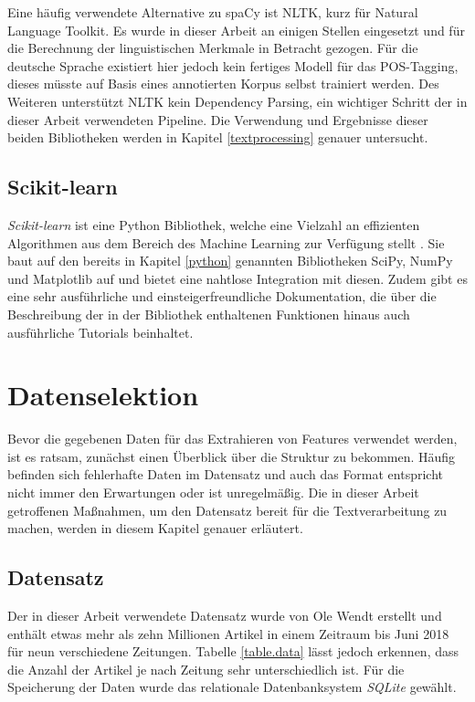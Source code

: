 Eine häufig verwendete Alternative zu spaCy ist NLTK, kurz für Natural Language Toolkit. Es wurde in dieser Arbeit an einigen Stellen eingesetzt und für die Berechnung der linguistischen Merkmale in Betracht gezogen. Für die deutsche Sprache existiert hier jedoch kein fertiges Modell für das POS-Tagging, dieses müsste auf Basis eines annotierten Korpus selbst trainiert werden. Des Weiteren unterstützt NLTK kein Dependency Parsing, ein wichtiger Schritt der in dieser Arbeit verwendeten Pipeline. Die Verwendung und Ergebnisse dieser beiden Bibliotheken werden in Kapitel \ref{textprocessing} genauer untersucht.

\subsection{Scikit-learn}
\emph{Scikit-learn} ist eine Python Bibliothek, welche eine Vielzahl an effizienten Algorithmen aus dem Bereich des Machine Learning zur Verfügung stellt \cite{scikit-learn}. Sie baut auf den bereits in Kapitel \ref{python} genannten Bibliotheken SciPy, NumPy und Matplotlib auf und bietet eine nahtlose Integration mit diesen. Zudem gibt es eine sehr ausführliche und einsteigerfreundliche Dokumentation, die über die Beschreibung der in der Bibliothek enthaltenen Funktionen hinaus auch ausführliche Tutorials beinhaltet.

\section{Datenselektion}
Bevor die gegebenen Daten für das Extrahieren von Features verwendet werden, ist es ratsam, zunächst einen Überblick über die Struktur zu bekommen. Häufig befinden sich fehlerhafte Daten im Datensatz und auch das Format entspricht nicht immer den Erwartungen oder ist unregelmäßig. Die in dieser Arbeit getroffenen Maßnahmen, um den Datensatz bereit für die Textverarbeitung zu machen, werden in diesem Kapitel genauer erläutert.

\subsection{Datensatz}
Der in dieser Arbeit verwendete Datensatz wurde von Ole Wendt erstellt und enthält etwas mehr als zehn Millionen Artikel in einem Zeitraum bis Juni 2018 für neun verschiedene Zeitungen. Tabelle \ref{table.data} lässt jedoch erkennen, dass die Anzahl der Artikel je nach Zeitung sehr unterschiedlich ist. Für die Speicherung der Daten wurde das relationale Datenbanksystem \emph{SQLite} gewählt.

